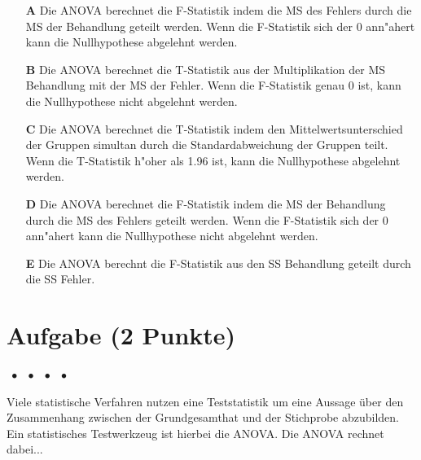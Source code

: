 \documentclass[a4paper, 9pt]{scrartcl}\usepackage[]{graphicx}\usepackage[]{xcolor}
\begin{document}
\begin{enumerate}
\item [\textbf{A} \msquare] Die ANOVA berechnet die F-Statistik indem die MS des Fehlers durch die MS der Behandlung geteilt werden. Wenn die F-Statistik sich der 0 ann{"a}hert kann die Nullhypothese abgelehnt werden.
\item [\textbf{B} \msquare] Die ANOVA berechnet die T-Statistik aus der Multiplikation der MS Behandlung mit der MS der Fehler. Wenn die F-Statistik genau 0 ist, kann die Nullhypothese nicht abgelehnt werden.
\item [\textbf{C} \msquare] Die ANOVA berechnet die T-Statistik indem den Mittelwertsunterschied der Gruppen simultan durch die Standardabweichung der Gruppen teilt. Wenn die T-Statistik h{"o}her als 1.96 ist, kann die Nullhypothese abgelehnt werden.
\item [\textbf{D} \msquare] Die ANOVA berechnet die F-Statistik indem die MS der Behandlung durch die MS des Fehlers geteilt werden. Wenn die F-Statistik sich der 0 ann{"a}hert kann die Nullhypothese nicht abgelehnt werden.
\item [\textbf{E} \msquare] Die ANOVA berechnt die F-Statistik aus den SS Behandlung geteilt durch die SS Fehler.
\end{enumerate}

\section{Aufgabe \hfill (2 Punkte)}

\ifcollection
\begin{flushright}
\tiny\vspace{-2Ex}
\textbf{\examinhaltstart}
\exammodulemathstat $\;\bullet$
\exammodulestat $\;\bullet$
\exammodulestatbbv $\;\bullet$
\exammodulestatversuch $\;\bullet$
\exammodulebiostat
\vspace{-1Ex}
\end{flushright}
\fi




Viele statistische Verfahren nutzen eine Teststatistik um eine Aussage über den Zusammenhang zwischen der Grundgesamthat und der Stichprobe abzubilden. Ein statistisches Testwerkzeug ist hierbei die ANOVA. Die ANOVA rechnet dabei...
\end{document}
